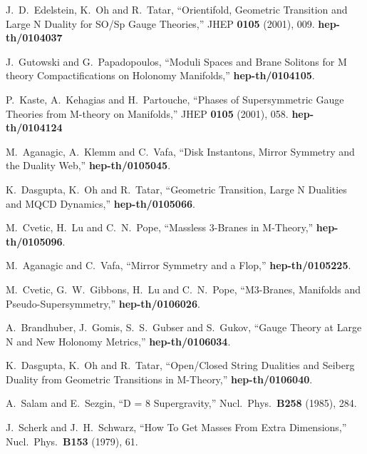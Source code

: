 \documentclass[12pt,a4paper]{article}
\begin{document}
\begin{thebibliography}{99}
 J.~D.~Edelstein, K.~Oh and R.~Tatar,
``Orientifold, Geometric Transition and Large N Duality for SO/Sp Gauge Theories,''
JHEP {\bf 0105} (2001), 009. {\bf hep-th/0104037}

 J.~Gutowski and G.~Papadopoulos,
``Moduli Spaces and Brane Solitons for M theory Compactifications on Holonomy \coordHE{} Manifolds,''
{\bf hep-th/0104105}.

 P.~Kaste, A.~Kehagias and H.~Partouche,
``Phases of Supersymmetric Gauge Theories from M-theory on \coordHE{} Manifolds,''
JHEP {\bf 0105} (2001), 058. {\bf hep-th/0104124}

 M.~Aganagic, A.~Klemm and C.~Vafa,
``Disk Instantons, Mirror Symmetry and the Duality Web,''
{\bf hep-th/0105045}.

 K.~Dasgupta, K.~Oh and R.~Tatar,
``Geometric Transition, Large N Dualities and MQCD Dynamics,'' {\bf hep-th/0105066}.

 M.~Cvetic, H.~Lu and C.~N.~Pope,
``Massless 3-Branes in M-Theory,'' {\bf hep-th/0105096}.

 M.~Aganagic and C.~Vafa,
``Mirror Symmetry and a \coordHE{} Flop,'' {\bf hep-th/0105225}.

 M.~Cvetic, G.~W.~Gibbons, H.~Lu and C.~N.~Pope,
``M3-Branes, \coordHE{} Manifolds and Pseudo-Supersymmetry,''
{\bf hep-th/0106026}.

 A.~Brandhuber, J.~Gomis, S.~S.~Gubser and S.~Gukov,
``Gauge Theory at Large N and New \coordHE{} Holonomy Metrics,''
{\bf hep-th/0106034}.

 K.~Dasgupta, K.~Oh and R.~Tatar,
``Open/Closed String Dualities and Seiberg Duality from Geometric Transitions in M-Theory,''
{\bf hep-th/0106040}.

 A.~Salam and E.~Sezgin, ``D = 8 Supergravity,''
Nucl.\ Phys.\ {\bf B258} (1985), 284.

 J.~Scherk and J.~H.~Schwarz, ``How To Get Masses From Extra Dimensions,''
Nucl.\ Phys.\ {\bf B153} (1979), 61.


\end{thebibliography}
\end{document}
